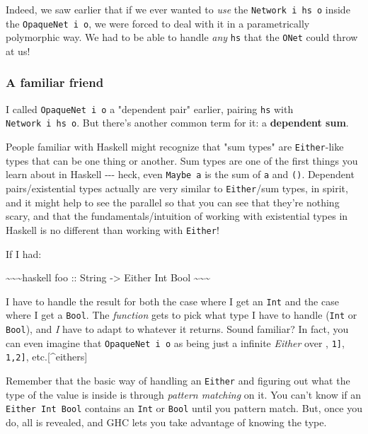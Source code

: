 \documentclass[]{article}
\begin{document}
Indeed, we saw earlier that if we ever wanted to \emph{use} the
\texttt{Network\ i\ hs\ o} inside the \texttt{OpaqueNet\ i\ o}, we were forced
to deal with it in a parametrically polymorphic way. We had to be able to handle
\emph{any} \texttt{hs} that the \texttt{ONet} could throw at us!

\subsubsection{A familiar friend}

I called \texttt{OpaqueNet\ i\ o} a "dependent pair" earlier, pairing
\texttt{hs} with \texttt{Network\ i\ hs\ o}. But there's another common term for
it: a \textbf{dependent sum}.

People familiar with Haskell might recognize that "sum types" are
\texttt{Either}-like types that can be one thing or another. Sum types are one
of the first things you learn about in Haskell -\/-\/- heck, even
\texttt{Maybe\ a} is the sum of \texttt{a} and \texttt{()}. Dependent
pairs/existential types actually are very similar to \texttt{Either}/sum types,
in spirit, and it might help to see the parallel so that you can see that
they're nothing scary, and that the fundamentals/intuition of working with
existential types in Haskell is no different than working with \texttt{Either}!

If I had:

\textasciitilde{}\textasciitilde{}\textasciitilde{}haskell foo :: String
-\textgreater{} Either Int Bool
\textasciitilde{}\textasciitilde{}\textasciitilde{}

I have to handle the result for both the case where I get an \texttt{Int} and
the case where I get a \texttt{Bool}. The \emph{function} gets to pick what type
I have to handle (\texttt{Int} or \texttt{Bool}), and \emph{I} have to adapt to
whatever it returns. Sound familiar? In fact, you can even imagine that
\texttt{OpaqueNet\ i\ o} as being just a infinite \emph{Either} over
\texttt{\textquotesingle{}{[}{]}}, \texttt{\textquotesingle{}{[}1{]}},
\texttt{\textquotesingle{}{[}1,2{]}}, etc.{[}\^{}eithers{]}

Remember that the basic way of handling an \texttt{Either} and figuring out what
the type of the value is inside is through \emph{pattern matching} on it. You
can't know if an \texttt{Either\ Int\ Bool} contains an \texttt{Int} or
\texttt{Bool} until you pattern match. But, once you do, all is revealed, and
GHC lets you take advantage of knowing the type.
\end{document}
